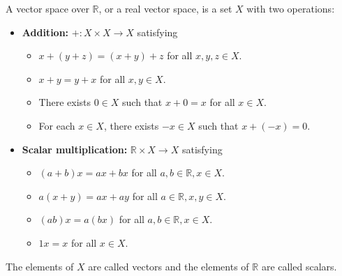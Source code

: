 A vector space over $\mathbb{R}$, or a real vector space, is a set $X$ with two operations:

\begin{itemize}
\item \textbf{Addition:} $+: X \times X \to X$ satisfying
  \begin{itemize}
  \item[V1.] $x + (y + z) = (x + y) + z$ for all $x, y, z \in X$.
  \item[V2.] $x + y = y + x$ for all $x, y \in X$.
  \item[V3.] There exists $0 \in X$ such that $x + 0 = x$ for all $x \in X$.
  \item[V4.] For each $x \in X$, there exists $-x \in X$ such that $x + (-x) = 0$.
  \end{itemize}
\item \textbf{Scalar multiplication:} $\mathbb{R} \times X \to X$ satisfying
  \begin{itemize}
  \item[V5.] $(a + b)x = ax + bx$ for all $a, b \in \mathbb{R}, x \in X$.
  \item[V6.] $a(x + y) = ax + ay$ for all $a \in \mathbb{R}, x, y \in X$.
  \item[V7.] $(ab)x = a(bx)$ for all $a, b \in \mathbb{R}, x \in X$.
  \item[V8.] $1x = x$ for all $x \in X$.
  \end{itemize}
\end{itemize}

The elements of $X$ are called vectors and the elements of $\mathbb{R}$ are called scalars.
